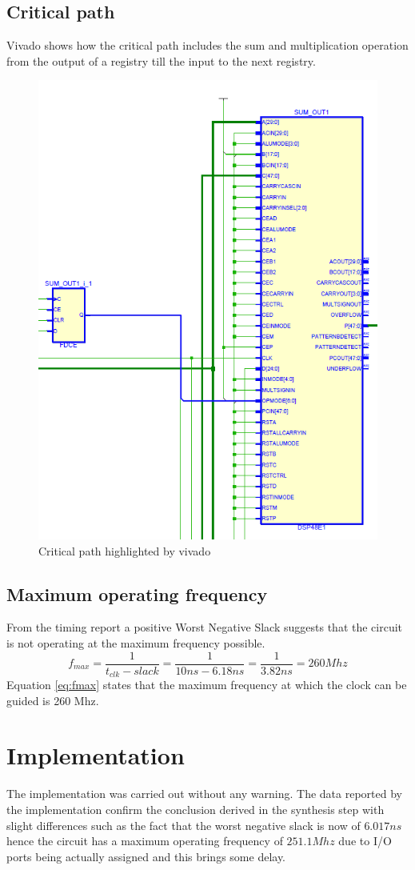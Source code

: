\subsection{Critical path} %
\label{sub:critical_path}
Vivado shows how the critical path includes the sum and multiplication operation from the output of a registry till the input to the next registry.
 \begin{figure}[H]
   \centering
   \includegraphics[width=0.5\linewidth]{./images/critical}
   \caption{Critical path highlighted by vivado}
   \label{fig:critical}
 \end{figure}
\subsection{Maximum operating frequency} %
\label{sub:maximum_operating_frequency}
From the timing report a positive Worst Negative Slack suggests that the circuit is not operating at the maximum frequency possible.
\begin{equation}
	f_{max} = \frac{1}{t_{clk}-slack}=\frac{1}{10ns-6.18ns}= \frac{1}{3.82ns}= 260 Mhz
	\label{eq:fmax}
\end{equation}
Equation \ref{eq:fmax} states that the maximum frequency at which the clock can be guided is 260 Mhz.

\section{Implementation}
The implementation was carried out without any warning. The data reported by the implementation confirm the conclusion derived in the synthesis step with slight differences such as the fact that the worst negative slack is now of $6.017ns$ hence the circuit has a maximum operating frequency of $251.1Mhz$ due to I/O ports being actually assigned and this brings some delay. 
